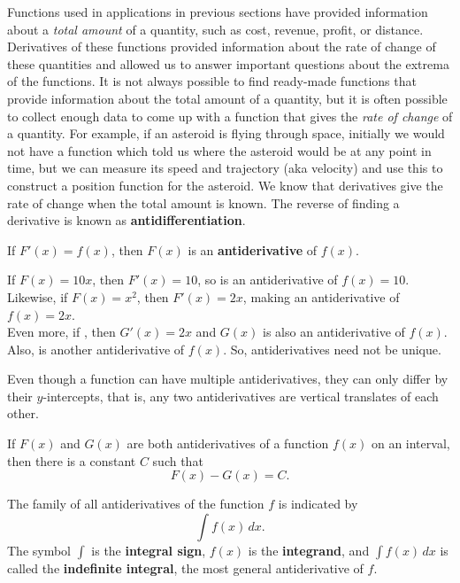 \documentclass{book}
\begin{document}
Functions used in applications in previous sections have provided information about a \emph{total amount} of a quantity, such as cost, revenue, profit, or distance. Derivatives of these functions provided information about the rate of change of these quantities and allowed us to answer important questions about the extrema of the functions. It is not always possible to find ready-made functions that provide information about the total amount of a quantity, but it is often possible to collect enough data to come up with a function that gives the \emph{rate of change} of a quantity. For example, if an asteroid is flying through space, initially we would not have a function which told us where the asteroid would be at any point in time, but we can measure its speed and trajectory (aka velocity) and use this to construct a position function for the asteroid. We know that derivatives give the rate of change when the total amount is known. The reverse of finding a derivative is known as \textbf{antidifferentiation}.

\begin{Def} If $F'(x) = f(x)$, then $F(x)$ is an \textbf{antiderivative} of $f(x).$
\end{Def}\vs

\begin{Exam} If $F(x) = 10x$, then $F'(x) = 10$, so  is an antiderivative of $f(x) =10$.\\

 Likewise, if $F(x) = x^2$, then $F'(x) = 2x$, making  an antiderivative of $f(x) = 2x$.\\

 Even more, if , then $G'(x)  = 2x$ and $G(x)$ is also an antiderivative of $f(x)$. Also,  is another antiderivative of $f(x)$. So, antiderivatives need not be unique. 
 \end{Exam}\vs

Even though a function can have multiple antiderivatives, they can only differ by their $y$-intercepts, that is, any two antiderivatives are vertical translates of each other.

\begin{Thm} If $F(x)$ and $G(x)$ are both antiderivatives of a function $f(x)$ on an interval, then there is a constant $C$  such that \[ F(x) - G(x) = C.\]\end{Thm}\vs

\begin{Def} The family of all antiderivatives of the function $f$ is indicated by \[\int f(x)\,dx.\] The symbol $\int$ is the \textbf{integral sign}, $f(x)$ is the \textbf{integrand}, and $\int f(x)\,dx$ is called the \textbf{indefinite integral}, the most general antiderivative of $f$.
\end{Def}\vs
\end{document}
